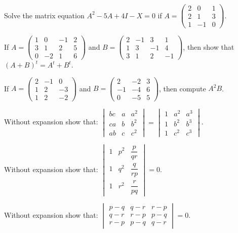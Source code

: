 \documentclass[11pt,a4paper]{article}
\begin{document}
\begin{longlist}
\item Solve the matrix equation $A^2-5A+4I-X=0$ if $A=\begin{pmatrix}2 & 0 & 1\\ 2 & 1 & 3\\ 1 & -1 & 0\end{pmatrix}$.

\item If $A=\begin{pmatrix}1 & 0 & -1 & 2\\ 3 & 1 & 2 & 5\\ 0 & -2 & 1 & 6\end{pmatrix}$ and $B=\begin{pmatrix}2 & -1 & 3 & 1\\ 1 & 3 & -1 & 4\\ 3 & 1 & 2 & -1\end{pmatrix}$, then show that $(A+B)^t=A^t+B^t$.

\item If $A=\begin{pmatrix}2 & -1 & 0\\ 1 & 2 & -3\\ 1 & 2 & -2\end{pmatrix}$ and $B=\begin{pmatrix}2 & -2 & 3\\ -1 & -4 & 6\\ 0 & -5 & 5\end{pmatrix}$, then compute $A^2B$.

\item Without expansion show that: $\begin{vmatrix}bc & a & a^2\\ ca & b & b^2\\ ab & c & c^2\end{vmatrix}=\begin{vmatrix}1 & a^2 & a^3\\ 1 & b^2 & b^3\\ 1 & c^2 & c^3\end{vmatrix}$.

\item Without expansion show that: $\begin{vmatrix}1 & p^2 & \dfrac{p}{qr}\\ 1 & q^2 & \dfrac{q}{rp}\\ 1 & r^2 & \dfrac{r}{pq}\end{vmatrix}=0$.

\item Without expansion show that: $\begin{vmatrix}p-q & q-r & r-p\\ q-r & r-p & p-q\\ r-p & p-q & q-r\end{vmatrix}=0$.


\end{longlist}
\end{document}
